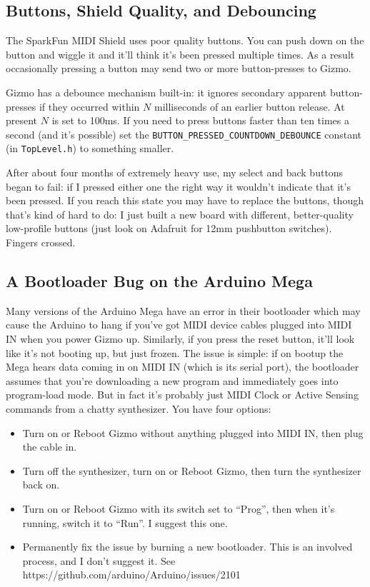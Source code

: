 \documentclass{article}
\begin{document}
\subsection{Buttons, Shield Quality, and Debouncing}
\label{debouncing}

The SparkFun MIDI Shield uses poor quality buttons.  You can push down on the button and wiggle it and it'll think it's been pressed multiple times.  As a result occasionally pressing a button may send two or more button-presses to Gizmo.

Gizmo has a debounce mechanism built-in: it ignores secondary apparent button-presses if they occurred within \(N\) milliseconds of an earlier button release.  At present \(N\) is set to 100ms.  If you need to press buttons faster than ten times a second (and it's possible) set the \texttt{BUTTON\_PRESSED\_COUNTDOWN\_DEBOUNCE} constant (in \texttt{TopLevel.h}) to something smaller.

After about four months of extremely heavy use, my select and back buttons began to fail: if I pressed either one the right way it wouldn't indicate that it's been pressed.  If you reach this state you may have to replace the buttons, though that's kind of hard to do: I just built a new board with different, better-quality low-profile buttons (just look on Adafruit for 12mm pushbutton switches).  Fingers crossed.

\subsection{A Bootloader Bug on the Arduino Mega}

Many versions of the Arduino Mega have an error in their bootloader which may cause the Arduino to hang if you've got MIDI device cables plugged into MIDI IN when you power Gizmo up.  Similarly, if you press the reset button, it'll look like it's not booting up, but just frozen.  The issue is simple: if on bootup the Mega hears data coming in on MIDI IN (which is its serial port), the bootloader assumes that you're downloading a new program and immediately goes into program-load mode.    But in fact it's probably just MIDI Clock or Active Sensing commands from a chatty synthesizer.  You have four options:

\begin{itemize}
\item Turn on or Reboot Gizmo without anything plugged into MIDI IN, then plug the cable in.
\item Turn off the synthesizer, turn on or Reboot Gizmo, then turn the synthesizer back on.
\item Turn on or Reboot Gizmo with its switch set to ``Prog'', then when it's running, switch it to ``Run''.  I suggest this one.
\item Permanently fix the issue by burning a new bootloader.  This is an involved process, and I don't suggest it.  See https:/\!/github.com/arduino/Arduino/issues/2101
\end{itemize}
\end{document}
